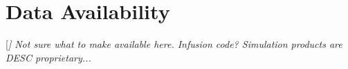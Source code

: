 \section*{Data Availability}

 
{[\it] Not sure what to make available here. Infusion code? Simulation products are DESC proprietary...}